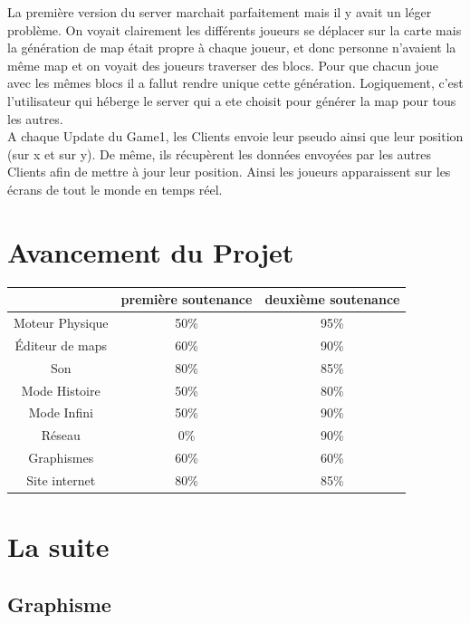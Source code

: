 \documentclass [11pt]{report}
\begin{document}
		La première version du server marchait parfaitement mais il y avait un léger problème. On voyait clairement les différents joueurs se déplacer sur la carte mais la génération de map était propre à chaque joueur, et donc personne n'avaient la même map et on voyait des joueurs traverser des blocs. Pour que chacun joue avec les mêmes blocs il a fallut rendre unique cette génération. Logiquement, c'est l'utilisateur qui héberge le server qui a ete choisit pour générer la map pour tous les autres.\\
				
		A chaque Update du Game1, les Clients envoie leur pseudo ainsi que leur position (sur x et sur y). De même, ils récupèrent les données envoyées par les autres Clients afin de mettre à jour leur position. Ainsi les joueurs apparaissent sur les écrans de tout le monde en temps réel.
		
		
		
				
		
	
	
\chapter{Avancement du Projet}
	\renewcommand{\arraystretch}{2}
	\setlength{\tabcolsep}{0.7cm}
	\begin{tabular}{|c|c|c|}
	\hline  & premi\`ere soutenance & deuxi\`eme soutenance\\ 
	\hline Moteur Physique & 50\% & 95\% \\ 
	\hline \'Editeur de maps & 60\% & 90\% \\ 
	\hline Son & 80\% & 85\% \\ 
	\hline Mode Histoire & 50\% &  80\%\\ 
	\hline Mode Infini & 50\% & 90\% \\ 
	\hline Réseau &  0\% & 90\% \\ 
	\hline Graphismes & 60\% & 60\% \\ 
	\hline Site internet & 80\% & 85\% \\ 
	\hline
	\end{tabular} 
	
	
	
	
\chapter{La suite}
	\section{Graphisme}
\end{document}
